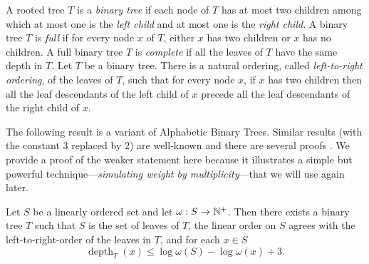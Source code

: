 \documentclass{patmorin}
\renewcommand{\le}{\leqslant}
\newcommand{\pat}[1]{\noindent\textcolor{Magenta}{PaMo: #1}}
\newcommand{\piotr}[1]{\noindent\textcolor{red}{PiMi: #1}}
\newcommand{\defin}[1]{\emph{\textcolor{brightmaroon}{#1}}}
\DeclareMathOperator{\depth}{depth}
\begin{document}
  A rooted tree $T$ is a \defin{binary tree} if each node of $T$ has at most two children among which at most one is the \defin{left child} and at most one is the \defin{right child}.
  A binary tree $T$ is \defin{full} if for every node $x$ of $T$,
  either $x$ has two children or $x$ has no children.
  A full binary tree $T$ is \defin{complete} if all the leaves of $T$ have the same depth in $T$.
  Let $T$ be a binary tree. There is a natural ordering, called \defin{left-to-right ordering}, of the leaves of $T$, such that for every node $x$, if $x$ has two children then all the leaf descendants of the left child of $x$ precede all the leaf descendants of the right child of $x$.


  The following result is a variant of Alphabetic Binary Trees. Similar results (with the constant $3$ replaced by $2$) are well-known and there are several proofs \cite{knuth:art_iii,mehlhorn:nearly,gilbert.moore:variable_length}. We provide a proof of the weaker statement here because it illustrates a simple but powerful technique---\defin{simulating weight by multiplicity}---that we will use again later.

   \begin{lem}\label{shannon_fano_elias_tree}\label{shannon_fano_elias}
    Let $S$ be a linearly ordered set and let $\omega:S\to\mathbb{N}^+$. Then there exists a binary tree $T$ such that $S$ is the set of leaves of $T$,
    the linear order on $S$ agrees with the left-to-right-order of the leaves in $T$, and for each $x\in S$
    \[
    \depth_{T}(x)\le \log\omega(S) - \log\omega(x) + 3.
    \]
  \end{lem}

\end{document}
